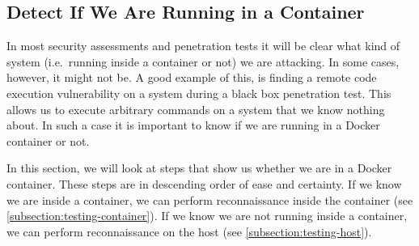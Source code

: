 \subsection{Detect If We Are Running in a Container}\label{subsection:detection}
In most security assessments and penetration tests it will be clear what kind of system (i.e.\ running inside a container or not) we are attacking. In some cases, however, it might not be. A good example of this, is finding a remote code execution vulnerability on a system during a black box penetration test. This allows us to execute arbitrary commands on a system that we know nothing about. In such a case it is important to know if we are running in a Docker container or not.

\medskip

In this section, we will look at steps that show us whether we are in a Docker container. These steps are in descending order of ease and certainty. If we know we are inside a container, we can perform reconnaissance inside the container (see \autoref{subsection:testing-container}). If we know we are not running inside a container, we can perform reconnaissance on the host (see \autoref{subsection:testing-host}).





